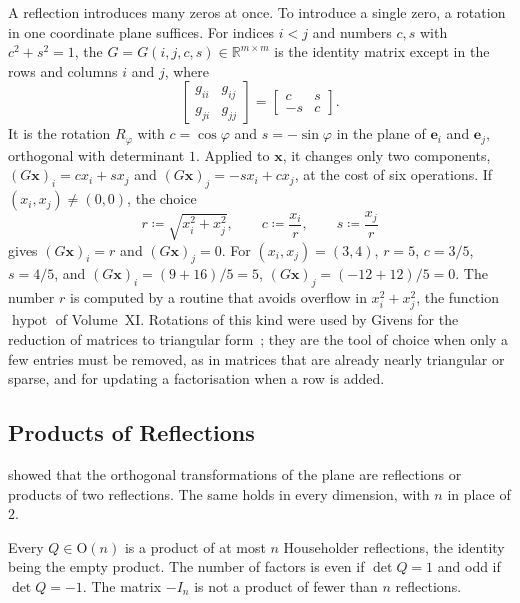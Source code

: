 A reflection introduces many zeros at once. To introduce a single zero, a rotation in one coordinate plane suffices. For indices $i<j$ and numbers $c,s$ with $c^2+s^2=1$, the  $G=G(i,j,c,s)\in\mathbb R^{m\times m}$ is the identity matrix except in the rows and columns $i$ and $j$, where
\[
\begin{bmatrix}g_{ii}&g_{ij}\\g_{ji}&g_{jj}\end{bmatrix}=\begin{bmatrix}c&s\\-s&c\end{bmatrix}.
\]
It is the rotation $R_\varphi$ with $c=\cos\varphi$ and $s=-\sin\varphi$ in the plane of $\mathbf e_i$ and $\mathbf e_j$, orthogonal with determinant $1$. Applied to $\mathbf x$, it changes only two components, $(G\mathbf x)_i=cx_i+sx_j$ and $(G\mathbf x)_j=-sx_i+cx_j$, at the cost of six operations. If $(x_i,x_j)\ne(0,0)$, the choice
\[
r\coloneqq\sqrt{x_i^2+x_j^2},\qquad c\coloneqq\frac{x_i}r,\qquad s\coloneqq\frac{x_j}r
\]
gives $(G\mathbf x)_i=r$ and $(G\mathbf x)_j=0$. For $(x_i,x_j)=(3,4)$, $r=5$, $c=3/5$, $s=4/5$, and $(G\mathbf x)_i=(9+16)/5=5$, $(G\mathbf x)_j=(-12+12)/5=0$. The number $r$ is computed by a routine that avoids overflow in $x_i^2+x_j^2$, the function $\operatorname{hypot}$ of Volume~XI. Rotations of this kind were used by Givens for the reduction of matrices to triangular form~\cite{givens1958}; they are the tool of choice when only a few entries must be removed, as in matrices that are already nearly triangular or sparse, and for updating a factorisation when a row is added.

\subsection{Products of Reflections}

 showed that the orthogonal transformations of the plane are reflections or products of two reflections. The same holds in every dimension, with $n$ in place of $2$.

\begin{theorem}
\label{thm:reflections-product}
Every $Q\in\mathrm O(n)$ is a product of at most $n$ Householder reflections, the identity being the empty product. The number of factors is even if $\det Q=1$ and odd if $\det Q=-1$. The matrix $-I_n$ is not a product of fewer than $n$ reflections.
\end{theorem}

